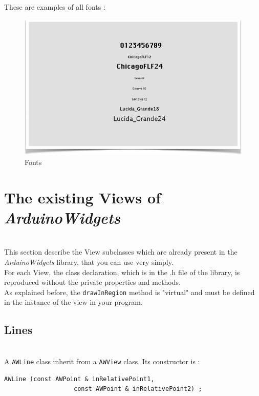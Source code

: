 \documentclass[a4paper,11pt]{extarticle}
\begin{document}
~\\ These are examples of all fonts :
\begin{figure}[htbp]
   \centering
   \includegraphics[scale=0.55]{AWFig91.png} 
   \caption{Fonts}
   \label{fig:91 }
\end{figure}


\newpage
\section{The existing Views of \emph{ArduinoWidgets}}

~\\ This section describe the View subclasses which are already present in the \emph{ArduinoWidgets} library, that you can use very simply.
~\\ For each View, the class declaration, which is in the .h file of the library, is reproduced without the private properties and methods.
~\\ As explained before, the \texttt{drawInRegion} method is "virtual" and must be defined in the instance of the view in your program.

\subsection{Lines}

~\\ A \texttt{AWLine} class inherit from a \texttt{AWView} class. Its constructor is :

\begin{lstlisting}[language=Arduinonl]
  AWLine (const AWPoint & inRelativePoint1,
                   const AWPoint & inRelativePoint2) ;
\end{lstlisting}
\end{document}
